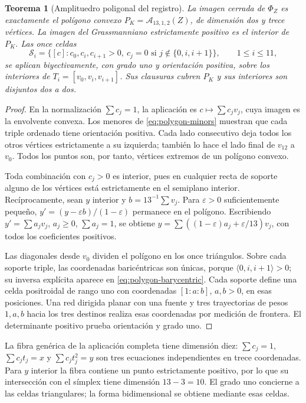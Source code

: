 \documentclass[a4paper,10pt]{article}
\newtheorem{theorem}{Teorema}[section]
\theoremstyle{definition}\newtheorem{definition}[theorem]{Definición}
\theoremstyle{remark}\newtheorem{remark}[theorem]{Observación}
\numberwithin{equation}{section}
\begin{document}
\begin{theorem}[Amplituedro poligonal del registro]
\label{thm:polygon-amplituhedron}
La imagen cerrada de \(\Phi_Z\) es exactamente el polígono convexo
\(P_K=\mathcal A_{13,1,2}(Z)\), de dimensión dos y trece vértices. La imagen
del Grassmanniano estrictamente positivo es el interior de \(P_K\).
Las once celdas
\begin{equation}
 \mathcal S_i=\{[c]:c_0,c_i,c_{i+1}>0,\
 c_j=0\text{ si }j\notin\{0,i,i+1\}\},\qquad 1\leq i\leq11,
 \label{eq:polygon-cells}
\end{equation}
se aplican biyectivamente, con grado uno y orientación positiva, sobre los
interiores de \(T_i=[v_0,v_i,v_{i+1}]\). Sus clausuras cubren \(P_K\) y sus
interiores son disjuntos dos a dos.
\end{theorem}
\begin{proof}
En la normalización \(\sum c_j=1\), la aplicación es
\(c\mapsto\sum c_jv_j\), cuya imagen es la envolvente convexa. Los menores
de \eqref{eq:polygon-minors} muestran que cada triple ordenado tiene
orientación positiva. Cada lado consecutivo deja todos los otros vértices
estrictamente a su izquierda; también lo hace el lado final de \(v_{12}\)
a \(v_0\). Todos los puntos son, por tanto, vértices extremos de un polígono
convexo.

Toda combinación con \(c_j>0\) es interior, pues en cualquier recta de
soporte alguno de los vértices está estrictamente en el semiplano
interior. Recíprocamente, sean \(y\) interior y
\(b=13^{-1}\sum v_j\). Para \(\varepsilon>0\) suficientemente pequeño,
\(y'=(y-\varepsilon b)/(1-\varepsilon)\) permanece en el polígono.
Escribiendo \(y'=\sum a_jv_j\), \(a_j\geq0\), \(\sum a_j=1\), se obtiene
\(y=\sum((1-\varepsilon)a_j+\varepsilon/13)v_j\), con todos los
coeficientes positivos.

Las diagonales desde \(v_0\) dividen el polígono en los once triángulos.
Sobre cada soporte triple, las coordenadas baricéntricas son únicas,
porque \(\langle0,i,i+1\rangle>0\); su inversa explícita aparece en
\eqref{eq:polygon-barycentric}. Cada soporte define una celda positroidal
de rango uno con coordenadas \([1:a:b]\), \(a,b>0\), en esas posiciones.
Una red dirigida planar con una fuente y tres trayectorias de pesos
\(1,a,b\) hacia los tres destinos realiza esas coordenadas por medición
de frontera. El determinante positivo prueba orientación y grado uno.
\end{proof}

La fibra genérica de la aplicación completa tiene dimensión diez:
\(\sum c_j=1\), \(\sum c_jt_j=x\) y \(\sum c_jt_j^2=y\) son tres
ecuaciones independientes en trece coordenadas. Para \(y\) interior la
fibra contiene un punto estrictamente positivo, por lo que su intersección
con el símplex tiene dimensión \(13-3=10\). El grado uno concierne a las
celdas triangulares; la forma bidimensional se obtiene mediante esas
celdas.
\end{document}
